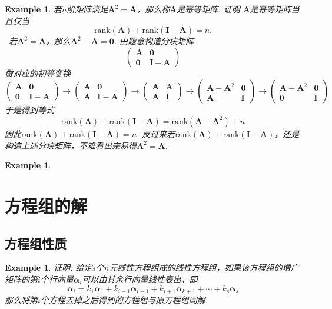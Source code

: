 \documentclass{article}
\newtheorem{example}[theorem]{Example}
\newcommand{\hints}{{\color{blue} \text{hints}}}
\newcommand{\mbf}[1]{\bm{#1}}
\newcommand{\rank}[1]{\text{rank}\left(#1\right)} %
\begin{document}
\begin{example}
\rm 若$n$阶矩阵满足$\mbf{A}^2 = \mbf{A}$，那么称$\mbf{A}$是幂等矩阵. 证明
$\mbf{A}$是幂等矩阵当且仅当
$$
\rank{\mbf{A}} + \rank{\mbf{I}-\mbf{A}} = n.
$$
\hints\ 若$\mbf{A}^2 = \mbf{A}$，那么$\mbf{A}^2 - \mbf{A} = \mbf{0}$. 由题意构造分块矩阵
$$
\begin{pmatrix}
\mbf{A} & \mbf{0} \\
\mbf{0} & \mbf{I}-\mbf{A}
\end{pmatrix}
$$
做对应的初等变换
$$
\begin{pmatrix}
\mbf{A} & \mbf{0} \\
\mbf{0} & \mbf{I}-\mbf{A}
\end{pmatrix} \longrightarrow 
\begin{pmatrix}
\mbf{A} & \mbf{0} \\
\mbf{A} & \mbf{I}-\mbf{A}
\end{pmatrix} \longrightarrow
\begin{pmatrix}
\mbf{A} & \mbf{A} \\
\mbf{A} & \mbf{I} 
\end{pmatrix} \longrightarrow
\begin{pmatrix}
\mbf{A}-\mbf{A}^2 & \mbf{0} \\
\mbf{A} & \mbf{I} 
\end{pmatrix} \longrightarrow
\begin{pmatrix}
\mbf{A}-\mbf{A}^2 & \mbf{0} \\
\mbf{0} & \mbf{I} 
\end{pmatrix}
$$
于是得到等式
$$
\rank{\mbf{A}} + \rank{\mbf{I}-\mbf{A}} = \rank{\mbf{A}-\mbf{A}^2} + n
$$ 
因此$\rank{\mbf{A}} + \rank{\mbf{I}-\mbf{A}} = n$. 反过来若$\rank{\mbf{A}} + \rank{\mbf{I}-\mbf{A}}$，还是构造上述分块矩阵，不难看出来易得$\mbf{A}^2 = \mbf{A}$. 


\end{example}

\begin{example}
\rm 
\end{example}

\newpage
\section{方程组的解}

\subsection{方程组性质}

\begin{example}
\rm 证明: 给定$s$个$n$元线性方程组成的线性方程组，如果该方程组的增广矩阵的第$i$个行向量$\mbf{\alpha}_i$可以由其余行向量线性表出，即
$$
\mbf{\alpha}_i = k_1\mbf{\alpha}_1 + k_{i-1}\mbf{\alpha}_{i-1} + k_{i+1}\mbf{\alpha}_{k+1} + \cdots + k_s\mbf{\alpha}_s 
$$
那么将第$i$个方程去掉之后得到的方程组与原方程组同解. 
\end{example}
\end{document}

